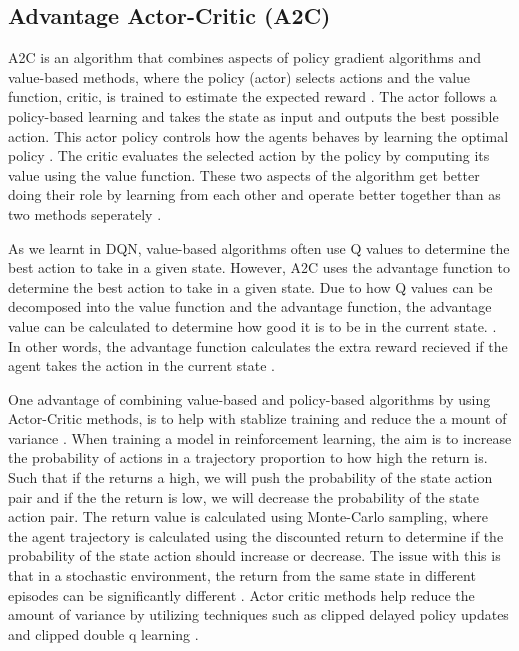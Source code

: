 \subsection{Advantage Actor-Critic (A2C)}

A2C is an algorithm that combines aspects of policy gradient algorithms and value-based methods, where the policy (actor) selects actions and the value function, critic, is trained to estimate the expected reward \cite{mnih2013playing}. The actor follows a policy-based learning and takes the state as input and outputs the best possible action. This actor policy controls how the agents behaves by learning the optimal policy \cite{SergiosKaragiannakos2018}. The critic evaluates the selected action by the policy by computing its value using the value function. These two aspects of the algorithm get better doing their role by learning from each other and operate better together than as two methods seperately \cite{SergiosKaragiannakos2018}. 

As we learnt in DQN, value-based algorithms often use Q values to determine the best action to take in a given state. However, A2C uses the advantage function to determine the best action to take in a given state. Due to how Q values can be decomposed into the value function and the advantage function, the advantage value can be calculated to determine how good it is to be in the current state. \cite{SergiosKaragiannakos2018}. In other words, the advantage function calculates the extra reward recieved if the agent takes the action in the current state \cite{ThomasSimonini2022A2C}.

One advantage of combining value-based and policy-based algorithms by using Actor-Critic methods, is to help with stablize training and reduce the a mount of variance \cite{SergiosKaragiannakos2018}. When training a model in reinforcement learning, the aim is to increase the probability of actions in a trajectory proportion to how high the return is. Such that if the returns a high, we will push the probability of the state action pair and if the the return is low, we will decrease the probability of the state action pair. The return value is calculated using Monte-Carlo sampling, where the agent trajectory is calculated using the discounted return to determine if the probability of the state action should increase or decrease. The issue with this is that in a stochastic environment, the return from the same state in different episodes can be significantly different \cite{ThomasSimonini2022A2C}. Actor critic methods help reduce the amount of variance by utilizing techniques such as clipped delayed policy updates and clipped double q learning \cite{padhye2023deep}.


